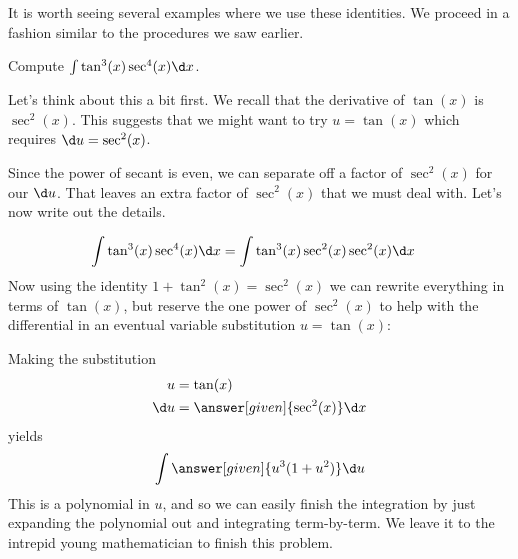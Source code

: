 \documentclass{ximera}
\begin{document}
It is worth seeing several examples where we use these identities. We proceed in a fashion similar to the procedures we saw earlier. 

\begin{example}
  Compute $\int \tan^3(x) \sec^4(x) \d x$.
  
  \begin{explanation}
    Let's think about this a bit first.  We recall that the derivative of $\tan(x)$ is $\sec^{2}(x)$. This suggests that we might want to try $u=\tan(x)$ which requires  $\d u=\sec^{2}(x)$.
     
    Since the power of secant is even, we can separate off a factor of $\sec^{2}(x)$ for our $\d u$. That leaves an extra factor
    of $\sec^{2}(x)$ that we must deal with. Let's now write out the details.

    \begin{align*}
    \int &\tan^3(x) \sec^4(x) \d x = \int\tan^3(x) \sec^2(x) \sec^2(x) \d x
    \end{align*}
    Now using the identity $1+\tan^{2}(x)=\sec^{2}(x)$ we can rewrite everything in
    terms of $\tan(x)$, but reserve the one power of $\sec^2(x)$ to help
    with the differential in an eventual variable substitution $u=\tan(x)$:
    \begin{center}%
    \end{center}
    Making the substitution
    \begin{align*}
       u &= \tan(x)\\
      \d u &=\answer[given]{\sec^2(x)} \d x
    \end{align*}
    yields
    \[
    \int \answer[given]{u^3(1+u^2)} \d u
    \]
    This is a polynomial in $u$, and so we can easily finish the
    integration by just expanding the polynomial out and integrating
    term-by-term. We leave it to the intrepid young mathematician to
    finish this problem.
  \end{explanation}
\end{example}
\end{document}
